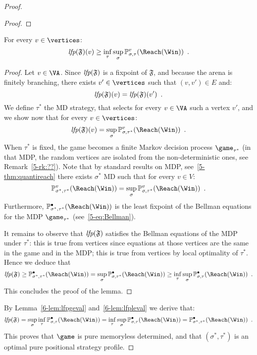 \begin{proof}
\begin{proof}
  \end{proof}

  \begin{lemma}
    \label{6-lem:lfpleval}
    For every $v \in \vertices$:
    \[
    \lfp(\mathfrak{F})(v) \ge \inf_\tau \sup_\sigma
    \probm_{\sigma,\tau}^v(\Reach(\Win)) \enspace.
    \]
  \end{lemma}

  \begin{proof}
    Let $v \in \VA$. Since $\textit{lfp}(\mathfrak{F})$ is a fixpoint of
    $\mathfrak{F}$, and because the arena is finitely branching, there exists $v'\in \vertices$ such
    that $(v,v') \in E$ and:
    \[
      \textit{lfp}(\mathfrak{F})(v) = \textit{lfp}(\mathfrak{F})(v') \enspace.
    \]
    We define $\tau^*$ the MD strategy, that selects for every
    $v\in \VA$ such a vertex $v'$, and we show now that for every
    $v \in \vertices$:
    \[
    \lfp(\mathfrak{F})(v) = \sup_\sigma
    \probm_{\sigma,\tau^*}^v(\Reach(\Win)) \enspace.
    \]
    When $\tau^*$ is fixed, the game becomes a finite Markov decision
    process $\game_{\tau^*}$ (in that MDP, the random vertices are
    isolated from the non-deterministic ones, see
    Remark~\cref{5-rk:??}). Note that by standard results on MDP,
    see~\cref{5-thm:quantireach} there exists $\sigma^*$ MD such that
    for every $v \in V$:
    \[
    \probm_{\sigma^*,\tau^*}^v(\Reach(\Win)) = \sup_\sigma
    \probm_{\sigma,\tau^*}^v(\Reach(\Win)) \enspace.
    \]
    Furthermore, $\probm_{\sigma^*,\tau^*}^\bullet(\Reach(\Win))$ is
    the least fixpoint of the Bellman equations for the MDP
    $\game_{\tau^*}$ (see~\cref{5-eq:Bellman}).
    
    It remains to observe that $\textit{lfp}(\mathfrak{F})$ satisfies the
    Bellman equations of the MDP under $\tau^*$: this is true from
    \Eve vertices since equations at those vertices are the same in
    the game and in the MDP; this is true from \Adam vertices by local
    optimality of $\tau^*$. Hence we deduce that
    \[
      \lfp(\mathfrak{F}) \ge
      \probm_{\sigma^*,\tau^*}^\bullet(\Reach(\Win)) = \sup_\sigma
      \probm_{\sigma,\tau^*}^\bullet(\Reach(\Win)) \ge \inf_\tau
      \sup_\sigma \probm_{\sigma,\tau}^\bullet(\Reach(\Win)) \enspace.
    \]
    This concludes the proof of the lemma. 
  \end{proof}
By Lemma~\cref{6-lem:lfpgeval} and~\cref{6-lem:lfpleval}  we derive that:
 \[
   \lfp(\mathfrak{F}) =
   \sup_\sigma \inf_\tau 
    \probm_{\sigma,\tau}^\bullet(\Reach(\Win)) =  \inf_\tau \sup_\sigma
   \probm_{\sigma,\tau}^\bullet(\Reach(\Win)) = 
   \probm_{\sigma^*,\tau^*}^\bullet(\Reach(\Win)) \enspace.
  \]
  This proves that $\game$ is pure memoryless determined, and that
  $(\sigma^*,\tau^*)$ is an optimal pure positional strategy profile.
   
\end{proof}

